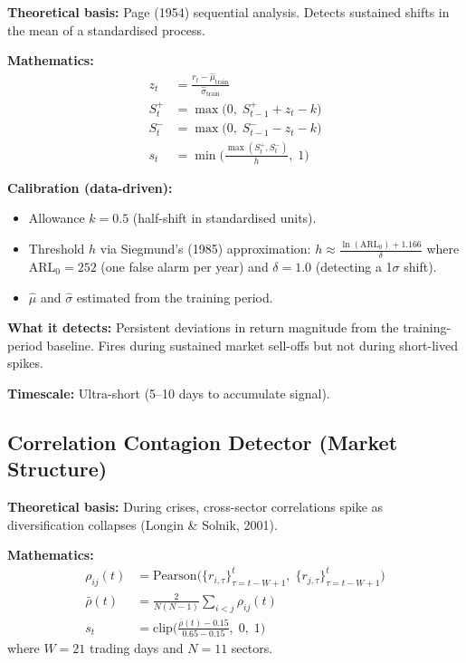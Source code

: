 \documentclass[11pt,a4paper]{article}
\begin{document}
\textbf{Theoretical basis:} Page (1954) sequential analysis. Detects sustained shifts in the mean of a standardised process.

\textbf{Mathematics:}
\begin{align}
  z_t &= \frac{r_t - \hat{\mu}_{\mathrm{train}}}{\hat{\sigma}_{\mathrm{train}}} \label{eq:cusum-zscore} \\
  S_t^{+} &= \max\!\big(0,\; S_{t-1}^{+} + z_t - k\big) \label{eq:cusum-plus} \\
  S_t^{-} &= \max\!\big(0,\; S_{t-1}^{-} - z_t - k\big) \label{eq:cusum-minus} \\
  s_t &= \min\!\Big(\frac{\max(S_t^{+}, S_t^{-})}{h},\; 1\Big) \label{eq:cusum-signal}
\end{align}

\textbf{Calibration (data-driven):}
\begin{itemize}[nosep]
  \item Allowance $k = 0.5$ (half-shift in standardised units).
  \item Threshold $h$ via Siegmund's (1985) approximation: $h \approx \frac{\ln(\mathrm{ARL}_0) + 1.166}{\delta}$ where $\mathrm{ARL}_0 = 252$ (one false alarm per year) and $\delta = 1.0$ (detecting a 1$\sigma$ shift).
  \item $\hat{\mu}$ and $\hat{\sigma}$ estimated from the training period.
\end{itemize}

\textbf{What it detects:} Persistent deviations in return magnitude from the training-period baseline. Fires during sustained market sell-offs but not during short-lived spikes.

\textbf{Timescale:} Ultra-short (5--10 days to accumulate signal).

\subsection{Correlation Contagion Detector (Market Structure)}

\textbf{Theoretical basis:} During crises, cross-sector correlations spike as diversification collapses (Longin \& Solnik, 2001).

\textbf{Mathematics:}
\begin{align}
  \rho_{ij}(t) &= \mathrm{Pearson}\big(\{r_{i,\tau}\}_{\tau=t-W+1}^{t},\; \{r_{j,\tau}\}_{\tau=t-W+1}^{t}\big) \\
  \bar{\rho}(t) &= \frac{2}{N(N-1)} \sum_{i<j} \rho_{ij}(t) \\
  s_t &= \mathrm{clip}\!\bigg(\frac{\bar{\rho}(t) - 0.15}{0.65 - 0.15},\; 0,\; 1\bigg) \label{eq:corr-signal}
\end{align}
where $W = 21$ trading days and $N = 11$ sectors.
\end{document}
